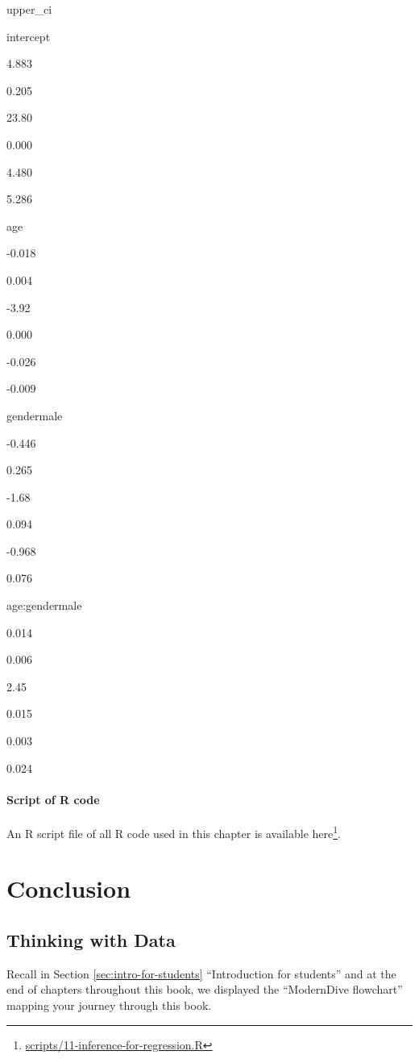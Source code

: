 \documentclass[12pt,]{krantz}
\renewcommand{\href}[2]{#2\footnote{\url{#1}}}
\begin{document}
upper\_ci

intercept

4.883

0.205

23.80

0.000

4.480

5.286

age

-0.018

0.004

-3.92

0.000

-0.026

-0.009

gendermale

-0.446

0.265

-1.68

0.094

-0.968

0.076

age:gendermale

0.014

0.006

2.45

0.015

0.003

0.024

\subsection{Script of R code}\label{script-of-r-code-8}

An R script file of all R code used in this chapter is available
\href{scripts/11-inference-for-regression.R}{here}.

\part{Conclusion}\label{part-conclusion}

\chapter{Thinking with Data}\label{thinking-with-data}

Recall in Section \ref{sec:intro-for-students} ``Introduction for
students'' and at the end of chapters throughout this book, we displayed
the ``ModernDive flowchart'' mapping your journey through this book.
\end{document}
